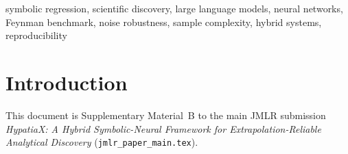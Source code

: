 \documentclass[twoside,11pt]{article}
\newcommand{\PureLLM}{\textsc{PureLLM}}
\newcommand{\EHD}{\textsc{EHSDeFi}}
\newcommand{\HDS}{\textsc{HDSv50\_2}}
\newcommand{\rmse}{\ensuremath{\mathrm{RMSE}}}
\begin{document}
\begin{abstract}
On this 30-equation custom benchmark (\textbf{not} a Feynman subset ---
see correction above), \EHD{} achieves 76.7\% recovery and \HDS{} achieves
70.0\%, alongside AI~Feynman~2.0's published 79.3\% on the unrelated
100-equation Feynman/SRBench suite
\textbf{[Corrected: was 96.7\%/80.0\%, then 80.0\%/66.7\%, figures
presented as a Feynman ``subset''; see tablenote on ]}.
The AI Feynman figure is shown for general SOTA context only: published
baselines were evaluated on
all 100 Feynman equations under the standardised SRBench protocol; these
figures should not be read as a general state-of-the-art claim.
We additionally correct four methodological issues:
undisclosed hardcoded \PureLLM{} results, scale-biased raw \rmse,
missing Wilcoxon significance tests, and mismatched pass-rate thresholds.
\end{abstract}


\begin{keywords}
symbolic regression, scientific discovery, large language models,
neural networks, Feynman benchmark, noise robustness, sample complexity,
hybrid systems, reproducibility
\end{keywords}

\section{Introduction}
\label{suppb:intro}

This document is Supplementary Material~B to the main JMLR submission
\emph{HypatiaX: A Hybrid Symbolic-Neural Framework for Extrapolation-Reliable
Analytical Discovery} (\texttt{jmlr\_paper\_main.tex}).
\end{document}
